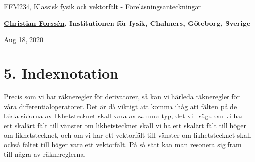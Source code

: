 \documentclass[%
oneside,                 %
final,                   %
10pt]{article}
\begin{document}

\newcommand{\exercisesection}[1]{\subsection*{#1}}







\thispagestyle{empty}

\begin{center}
{\LARGE\bf
\begin{spacing}{1.25}
FFM234, Klassisk fysik och vektorfält - Föreläsningsanteckningar
\end{spacing}
}
\end{center}


\begin{center}
{\bf \href{{http://fy.chalmers.se/subatom/tsp/}}{Christian Forssén}, Institutionen för fysik, Chalmers, Göteborg, Sverige${}^{}$} \\ [0mm]
\end{center}

\begin{center}
\end{center}
    

\begin{center}
Aug 18, 2020
\end{center}

\vspace{1cm}


\section*{5. Indexnotation}

Precis som vi har räkneregler för derivatorer, så kan vi härleda räkneregler för våra differentialoperatorer. Det är då viktigt att komma ihåg att fälten på de båda sidorna av likhetstecknet skall vara av samma typ, det vill säga om vi har ett skalärt fält till vänster om likhetstecknet skall vi ha ett skalärt fält till höger om likhetstecknet, och om vi har ett vektorfält till vänster om likhetstecknet skall också fältet till höger vara ett vektorfält.  På så sätt kan man resonera sig fram till några av räknereglerna.
\end{document}
